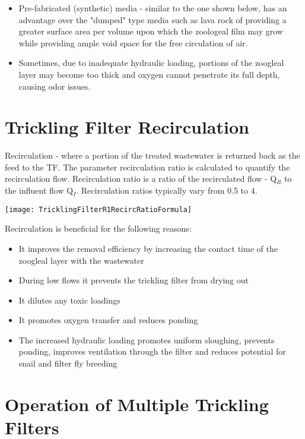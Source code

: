 \begin{itemize}
\item Pre-fabricated (synthetic) media - similar to the one shown below, has an advantage over the "dumped" type media such as lava rock of providing a greater surface area per volume upon which the zoologeal film may grow while providing ample void space for the free circulation of air.

\item Sometimes, due to inadequate hydraulic loading, portions of the zoogleal layer may become too thick and oxygen cannot penetrate its full depth, causing odor issues.

\end{itemize}


\section{Trickling Filter Recirculation}

Recirculation - where a portion of the treated wastewater is returned back as the feed to the TF.  The parameter recirculation ratio is calculated to quantify the recirculation flow.  Recirculation ratio is a ratio of the recirculated flow - Q$_R$ to the influent flow Q$_I$. Recirculation ratios typically vary from 0.5 to 4.
\begin{center}
\texttt{[image: TricklingFilterR1RecircRatioFormula]}
\end{center}
Recirculation is beneficial for the following reasons:
\begin{itemize}
\item It improves the removal efficiency by increasing the contact time of the zoogleal layer with the wastewater
\item During low flows it prevents the trickling filter from drying out
\item It dilutes any toxic loadings
\item It promotes oxygen transfer and reduces ponding
\item The increased hydraulic loading promotes uniform sloughing, prevents ponding, improves ventilation through the filter and reduces potential for snail and filter fly breeding
\end{itemize}
\section{Operation of Multiple Trickling Filters}

